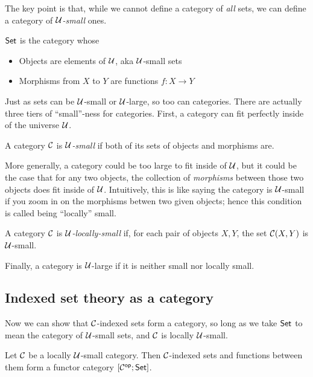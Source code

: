The key point is that, while we cannot define a category of \emph{all} sets, we can define a category of \emph{\(\mathcal U\)-small} ones.
\begin{definition}
  \(\mathsf{Set}\) is the category whose
  \begin{itemize}
    \item Objects are elements of \(\mathcal U\), aka \(\mathcal U\)-small sets
    \item Morphisms from \(X\) to \(Y\) are functions \(f : X \to Y\)
  \end{itemize}
\end{definition}
Just as sets can be \(\mathcal U\)-small or \(\mathcal U\)-large, so too can categories.
There are actually three tiers of ``small''-ness for categories.
First, a category can fit perfectly inside of the universe \(\mathcal U\).
\begin{definition}
  A category \(\mathcal C\) is \emph{\(\mathcal U\)-small} if both of its sets of objects and morphisms are.
\end{definition}
More generally, a category could be too large to fit inside of \(\mathcal U\), but it could be the case that for any two objects,
the collection of \emph{morphisms} between those two objects does fit inside of \(\mathcal U\).
Intuitively, this is like saying the category is \(\mathcal U\)-small if you zoom in on the morphisms betwen two given objects;
hence this condition is called being ``locally'' small.
\begin{definition}
  A category \(\mathcal C\) is \emph{\(\mathcal U\)-locally-small} if, for each pair of objects \(X,Y\),
  the set \(\mathcal C(X,Y)\) is \(\mathcal U\)-small.
\end{definition}
Finally, a category is \(\mathcal U\)-large if it is neither small nor locally small.

\subsection{Indexed set theory as a category}
Now we can show that \(\mathcal C\)-indexed sets form a category,
so long as we take \(\mathsf{Set}\) to mean the category of \(\mathcal U\)-small sets,
and \(\mathcal C\) is locally \(\mathcal U\)-small.
\begin{definition}
  Let \(\mathcal C\) be a locally \(\mathcal U\)-small category.
  Then \(\mathcal C\)-indexed sets and functions between them form a functor category \([\mathcal C^{\mathsf{op}};\mathsf{Set}]\).
\end{definition}

